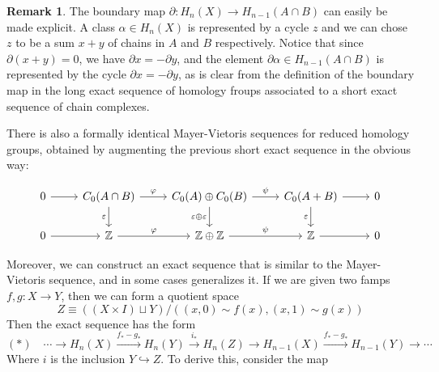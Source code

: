 \documentclass[11pt,a4paper]{article}
\theoremstyle{definition}
\newtheorem{remark}[definition]{Remark}
\theoremstyle{plain}
\theoremstyle{remark}
\begin{document}
\begin{remark}
The boundary map $\partial \colon H_n(X) \to H_{n-1} ( A \cap B)$ can easily be made explicit. 
A class $\alpha \in H_n(X)$ is represented by a cycle $z$ and we can chose $z$ to be a 
sum $x + y$ of chains in $A$ and $B$ respectively. Notice that since $\partial (x + y) = 0$, we have
$\partial x = - \partial y$, and the element $\partial \alpha \in H_{n-1} (A \cap B)$ is represented by the cycle $\partial x = - \partial y$, 
as is clear from the definition of the boundary map in the long exact sequence of homology froups associated to a short exact sequence of chain complexes. 

There is also a formally identical Mayer-Vietoris sequences for reduced homology groups, obtained by 
augmenting the previous short exact sequence in the obvious way: 

\[
\begin{tikzcd}
0 \arrow[r] &
C_{0}(A\cap B) \arrow[r, "\varphi"] \arrow[d, "\varepsilon"'] &
C_{0}(A)\oplus C_{0}(B) \arrow[r, "\psi"] \arrow[d, "\varepsilon \oplus \varepsilon"'] &
C_{0}(A+B) \arrow[r] \arrow[d, "\varepsilon"'] &
0 \\
0 \arrow[r] &
\mathbb{Z} \arrow[r, "\varphi"] &
\mathbb{Z}\oplus \mathbb{Z} \arrow[r, "\psi"] &
\mathbb{Z} \arrow[r] &
0
\end{tikzcd}
\]

Moreover, we can construct an exact sequence that is similar to the Mayer-Vietoris sequence, 
and in some cases generalizes it. If we are given two famps $f, g \colon X \to Y$, then 
we can form a quotient space 
$$Z \equiv \left((X \times I )\sqcup Y\right) \big/ \left( (x, 0) \sim f(x), (x, 1) \sim g(x)\right)$$
Then the exact sequence has the form 
$$(*) \quad \cdots \to H_n(X) \xrightarrow{f_* - g_*} H_n(Y) \xrightarrow{i_*} H_n(Z) \to H_{n-1} (X) \xrightarrow{f_* - g_*} H_{n-1} (Y) \to \cdots$$
Where $i$ is the inclusion $Y \hookrightarrow Z$. To derive this, consider the map 


\end{remark}
\end{document}
